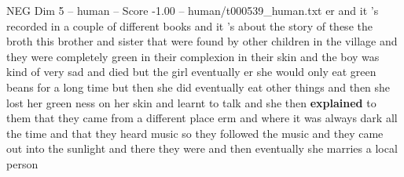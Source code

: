 \begin{textsample}{NEG Dim 5 – human – Score -1.00 – human/t000539\_human.txt}  \label{ex:f5_neg_031}
er and it 's recorded in a couple of different books and it 's about the story of these the broth this brother and sister that were found by other children in the village and they were completely green in their complexion in their skin and the boy was kind of very sad and died but the girl eventually er she would only eat green beans for a long time but then she did eventually eat other things and then she lost her green ness on her skin and learnt to talk and she then \textbf{explained} to them that they came from a different place erm and where it was always dark all the time and that they heard music so they followed the music and they came out into the sunlight and there they were and then eventually she marries a local person

\end{textsample}
